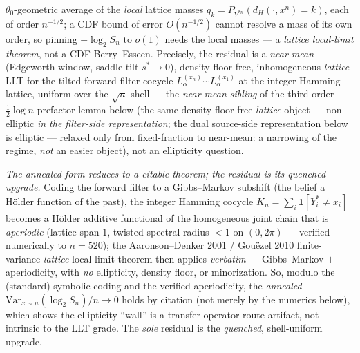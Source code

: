 \documentclass[
]{article}
\begin{document}
$\theta_0$-geometric average of the \emph{local} lattice masses $q_k=P_{Y^{*n}}(d_H(\cdot,x^n)=k)$, each
of order $n^{-1/2}$; a CDF bound of error $O(n^{-1/2})$ cannot resolve a mass of its own order, so
pinning $-\log_2 S_n$ to $o(1)$ needs the local masses --- a \emph{lattice local-limit theorem}, not a
CDF Berry--Esseen. Precisely, the residual is a \emph{near-mean} (Edgeworth window, saddle tilt
$s^*\to0$), density-floor-free, inhomogeneous \emph{lattice} LLT for the tilted forward-filter cocycle
$L_\alpha^{(x_n)}\cdots L_\alpha^{(x_1)}$ at the integer Hamming lattice, uniform over the $\sqrt
n$-shell --- the \emph{near-mean sibling} of the third-order $\tfrac12\log n$-prefactor lemma below (the
same density-floor-free \emph{lattice} object --- non-elliptic \emph{in the filter-side
representation}; the dual source-side representation below is elliptic --- relaxed only from
fixed-fraction to near-mean: a narrowing of the regime, \emph{not} an easier object), not an
ellipticity question.

\emph{The annealed form reduces to a citable theorem; the residual is its quenched upgrade.} Coding the
forward filter to a Gibbs--Markov subshift (the belief a H\"older function of the past), the integer
Hamming cocycle $K_n=\sum_i\mathbf 1[Y^*_i\ne x_i]$ becomes a H\"older additive functional of the
homogeneous joint chain that is \emph{aperiodic} (lattice span $1$, twisted spectral radius $<1$ on
$(0,2\pi)$ --- verified numerically to $n=520$); the Aaronson--Denker 2001 / Gou\"ezel 2010
finite-variance \emph{lattice} local-limit theorem then applies \emph{verbatim} --- Gibbs--Markov $+$
aperiodicity, with \emph{no} ellipticity, density floor, or minorization. So, modulo the (standard)
symbolic coding and the verified aperiodicity, the \emph{annealed} $\mathrm{Var}_{x\sim\mu}(\log_2
S_n)/n\to0$ holds by citation (not merely by the numerics below), which shows the ellipticity ``wall''
is a transfer-operator-route artifact, not intrinsic to the LLT grade. The \emph{sole} residual is the
\emph{quenched}, shell-uniform upgrade.
\end{document}
